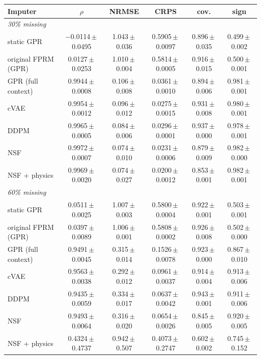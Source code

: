 \begin{tabular}{lccccc}
\toprule
Imputer & $\rho$ & NRMSE & CRPS & cov. & sign\\
\midrule
\multicolumn{6}{l}{\textit{30\% missing}}\\
static GPR & $-$0.0114\,$\pm$\,0.0495 & 1.043\,$\pm$\,0.036 & 0.5905\,$\pm$\,0.0097 & 0.896\,$\pm$\,0.035 & 0.499\,$\pm$\,0.002\\
original FPRM (GPR) & 0.0127\,$\pm$\,0.0253 & 1.010\,$\pm$\,0.004 & 0.5814\,$\pm$\,0.0005 & 0.916\,$\pm$\,0.015 & 0.500\,$\pm$\,0.001\\
GPR (full context) & 0.9944\,$\pm$\,0.0008 & 0.106\,$\pm$\,0.008 & 0.0361\,$\pm$\,0.0010 & 0.894\,$\pm$\,0.006 & 0.981\,$\pm$\,0.001\\
cVAE & 0.9954\,$\pm$\,0.0012 & 0.096\,$\pm$\,0.012 & 0.0275\,$\pm$\,0.0015 & 0.931\,$\pm$\,0.008 & 0.980\,$\pm$\,0.001\\
DDPM & 0.9965\,$\pm$\,0.0005 & 0.084\,$\pm$\,0.006 & 0.0296\,$\pm$\,0.0001 & 0.937\,$\pm$\,0.000 & 0.978\,$\pm$\,0.001\\
NSF & 0.9972\,$\pm$\,0.0007 & 0.074\,$\pm$\,0.010 & 0.0231\,$\pm$\,0.0006 & 0.879\,$\pm$\,0.009 & 0.982\,$\pm$\,0.000\\
NSF + physics & 0.9969\,$\pm$\,0.0020 & 0.074\,$\pm$\,0.027 & 0.0200\,$\pm$\,0.0012 & 0.853\,$\pm$\,0.001 & 0.982\,$\pm$\,0.001\\
\midrule
\multicolumn{6}{l}{\textit{60\% missing}}\\
static GPR & 0.0511\,$\pm$\,0.0025 & 1.007\,$\pm$\,0.003 & 0.5800\,$\pm$\,0.0004 & 0.922\,$\pm$\,0.001 & 0.503\,$\pm$\,0.001\\
original FPRM (GPR) & 0.0397\,$\pm$\,0.0089 & 1.006\,$\pm$\,0.001 & 0.5808\,$\pm$\,0.0002 & 0.926\,$\pm$\,0.008 & 0.502\,$\pm$\,0.000\\
GPR (full context) & 0.9491\,$\pm$\,0.0045 & 0.315\,$\pm$\,0.014 & 0.1526\,$\pm$\,0.0078 & 0.923\,$\pm$\,0.000 & 0.867\,$\pm$\,0.010\\
cVAE & 0.9563\,$\pm$\,0.0038 & 0.292\,$\pm$\,0.012 & 0.0961\,$\pm$\,0.0037 & 0.914\,$\pm$\,0.004 & 0.913\,$\pm$\,0.006\\
DDPM & 0.9435\,$\pm$\,0.0059 & 0.334\,$\pm$\,0.017 & 0.0637\,$\pm$\,0.0042 & 0.943\,$\pm$\,0.001 & 0.911\,$\pm$\,0.006\\
NSF & 0.9493\,$\pm$\,0.0064 & 0.316\,$\pm$\,0.020 & 0.0654\,$\pm$\,0.0026 & 0.845\,$\pm$\,0.005 & 0.920\,$\pm$\,0.005\\
NSF + physics & 0.4324\,$\pm$\,0.4737 & 0.942\,$\pm$\,0.507 & 0.4073\,$\pm$\,0.2747 & 0.602\,$\pm$\,0.002 & 0.745\,$\pm$\,0.152\\

\end{tabular}
